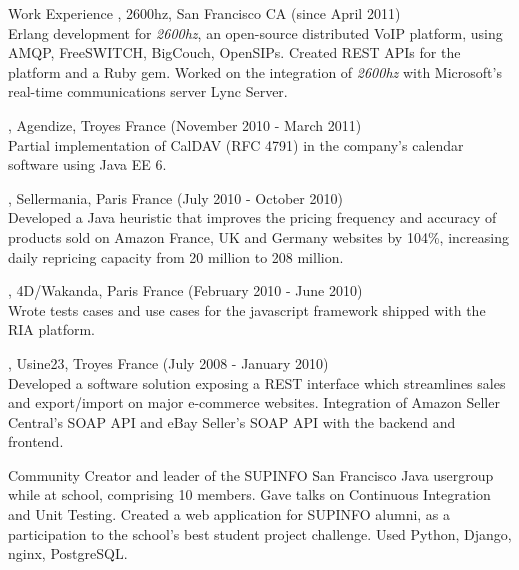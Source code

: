 \documentclass{resume}
\begin{document}
\begin{category}{Work Experience}
, 2600hz, San Francisco CA (since April 2011)
\\Erlang development for \emph{2600hz}, an open-source distributed VoIP platform, using AMQP, FreeSWITCH, BigCouch, OpenSIPs. Created REST APIs for the platform and a Ruby gem. Worked on the integration of \emph{2600hz} with Microsoft's real-time communications server Lync Server.

, Agendize, Troyes France (November 2010 - March 2011)
\\Partial implementation of CalDAV (RFC 4791) in the company's calendar software using Java EE 6.

, Sellermania, Paris France (July 2010 - October 2010)
\\Developed a Java heuristic that improves the pricing frequency and accuracy of products sold on Amazon France, UK and Germany websites by 104\%, increasing daily repricing capacity from 20 million to 208 million.

, 4D/Wakanda, Paris France (February 2010 - June 2010)
\\Wrote tests cases and use cases for the javascript framework shipped with the RIA platform.

, Usine23, Troyes France (July 2008 - January 2010)
\\Developed a software solution exposing a REST interface which streamlines sales and export/import on major e-commerce websites. Integration of Amazon Seller Central's SOAP API and eBay Seller's SOAP API with the backend and frontend.
\end{category}

\begin{category}{Community} 
\citemnobullet Creator and leader of the SUPINFO San Francisco Java usergroup while at school, comprising 10 members. Gave talks on Continuous Integration and Unit Testing.
\citemnobullet Created a web application for SUPINFO alumni, as a participation to the school's best student project challenge. 
Used Python, Django, nginx, PostgreSQL.
\end{category}
\end{document}
